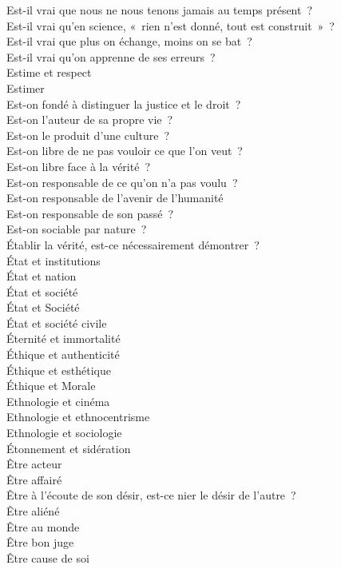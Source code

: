 \documentclass[a4paper,12pt]{article}
\begin{document}
Est-il vrai que nous ne nous tenons jamais au temps présent ? \\
Est-il vrai qu'en science, « rien n'est donné, tout est construit » ? \\
Est-il vrai que plus on échange, moins on se bat ? \\
Est-il vrai qu'on apprenne de ses erreurs ? \\
Estime et respect \\
Estimer \\
Est-on fondé à distinguer la justice et le droit ? \\
Est-on l'auteur de sa propre vie ? \\
Est-on le produit d'une culture ? \\
Est-on libre de ne pas vouloir ce que l'on veut ? \\
Est-on libre face à la vérité ? \\
Est-on responsable de ce qu'on n'a pas voulu ? \\
Est-on responsable de l'avenir de l'humanité \\
Est-on responsable de son passé ? \\
Est-on sociable par nature ? \\
Établir la vérité, est-ce nécessairement démontrer ? \\
État et institutions \\
État et nation \\
État et société \\
État et Société \\
État et société civile \\
Éternité et immortalité \\
Éthique et authenticité \\
Éthique et esthétique \\
Éthique et Morale \\
Ethnologie et cinéma \\
Ethnologie et ethnocentrisme \\
Ethnologie et sociologie \\
Étonnement et sidération \\
Être acteur \\
Être affairé \\
Être à l'écoute de son désir, est-ce nier le désir de l'autre ? \\
Être aliéné \\
Être au monde \\
Être bon juge \\
Être cause de soi \\
\end{document}
